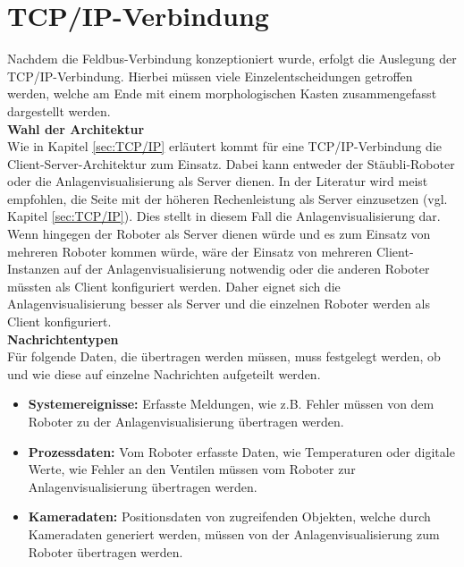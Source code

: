 \documentclass[ a4paper,
                oneside,
                toc=bibliography,
                toc=listof
                ]{scrbook}
\begin{document}
	\section{TCP/IP-Verbindung}
	Nachdem die Feldbus-Verbindung konzeptioniert wurde, erfolgt die Auslegung der TCP/IP-Verbindung. Hierbei müssen viele Einzelentscheidungen getroffen werden, welche am Ende mit einem morphologischen Kasten zusammengefasst dargestellt werden.\\
	\textbf{Wahl der Architektur} \\
	Wie in Kapitel \ref{sec:TCP/IP} erläutert kommt für eine TCP/IP-Verbindung die Client-Server-Architektur zum Einsatz. Dabei kann entweder der Stäubli-Roboter oder die Anlagenvisualisierung als Server dienen. In der Literatur wird meist empfohlen, die Seite mit der höheren Rechenleistung als Server einzusetzen (vgl. Kapitel \ref{sec:TCP/IP}). Dies stellt in diesem Fall die Anlagenvisualisierung dar. Wenn hingegen der Roboter als Server dienen würde und es zum Einsatz von mehreren Roboter kommen würde, wäre der Einsatz von mehreren Client-Instanzen auf der Anlagenvisualisierung notwendig oder die anderen Roboter müssten als Client konfiguriert werden. Daher eignet sich die Anlagenvisualisierung besser als Server und die einzelnen Roboter werden als Client konfiguriert. \\
	\textbf{Nachrichtentypen}\\
	Für folgende Daten, die übertragen werden müssen, muss festgelegt werden, ob und wie diese auf einzelne Nachrichten aufgeteilt werden.
	\begin{itemize}
		\item \textbf{Systemereignisse: } Erfasste Meldungen, wie z.B. Fehler müssen von dem Roboter zu der Anlagenvisualisierung übertragen werden.
		\item \textbf{Prozessdaten: } Vom Roboter erfasste Daten, wie Temperaturen oder digitale Werte, wie Fehler an den Ventilen müssen vom Roboter zur Anlagenvisualisierung übertragen werden.
		\item \textbf{Kameradaten:} Positionsdaten von zugreifenden Objekten, welche durch Kameradaten generiert werden, müssen von der Anlagenvisualisierung zum Roboter übertragen werden.\\
	\end{itemize}
\end{document}
